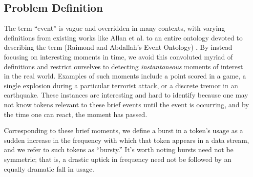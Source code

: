\documentclass{sig-alternate}
\begin{document}
\subsection{Problem Definition}

%
The term ``event'' is vague and overridden in many contexts, with varying definitions from existing works like Allan et al. to an entire ontology devoted to describing the term (Raimond and Abdallah's Event Ontology) \cite{Raimond2007,allan1998line}.
By instead focusing on interesting moments in time, we avoid this convoluted myriad of definitions and restrict ourselves to detecting \emph{instantaneous} moments of interest in the real world.
Examples of such moments include a point scored in a game, a single explosion during a particular terrorist attack, or a discrete tremor in an earthquake.
These instances are interesting and hard to identify because one may not know tokens relevant to these brief events until the event is occurring, and by the time one can react, the moment has passed. 

Corresponding to these brief moments, we define a burst in a token's usage as a sudden increase in the frequency with which that token appears in a data stream, and we refer to such tokens as ``bursty.''
It's worth noting bursts need not be symmetric; that is, a drastic uptick in frequency need not be followed by an equally dramatic fall in usage.
\end{document}
